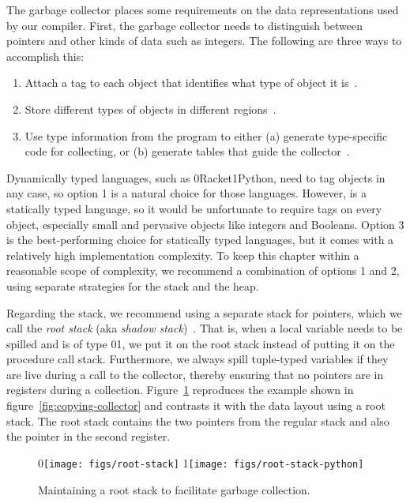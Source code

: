 \documentclass[7x10]{TimesAPriori_MIT}%
\def\racketEd{0}
\def\pythonEd{1}
\def\edition{1}
\newcommand{\racket}[1]{{\if\edition\racketEd{#1}\fi}}
\newcommand{\pythonColor}[0]{}
\newcommand{\python}[1]{{\if\edition\pythonEd\pythonColor #1\fi}}
\numberwithin{theorem}{chapter}
\numberwithin{definition}{chapter}
\numberwithin{equation}{chapter}
\begin{document}
The garbage collector places some requirements on the data
representations used by our compiler. First, the garbage collector
needs to distinguish between pointers and other kinds of data such as
integers. The following are three ways to accomplish this:
\begin{enumerate}
\item Attach a tag to each object that identifies what type of
  object it is~\citep{McCarthy:1960dz}.
\item Store different types of objects in different
  regions~\citep{Steele:1977ab}.
\item Use type information from the program to either (a) generate
  type-specific code for collecting, or (b) generate tables that 
  guide the collector~\citep{Appel:1989aa,Goldberg:1991aa,Diwan:1992aa}.
\end{enumerate}
Dynamically typed languages, such as \racket{Racket}\python{Python},
need to tag objects in any case, so option 1 is a natural choice for those
languages.  However, \LangVec{} is a statically typed language, so it
would be unfortunate to require tags on every object, especially small
and pervasive objects like integers and Booleans.  Option 3 is the
best-performing choice for statically typed languages, but it comes with
a relatively high implementation complexity. To keep this chapter
within a reasonable scope of complexity, we recommend a combination of options
1 and 2, using separate strategies for the stack and the heap.

Regarding the stack, we recommend using a separate stack for pointers,
which we call the \emph{root stack}
(aka \emph{shadow stack})~\citep{Siebert:2001aa,Henderson:2002aa,Baker:2009aa}.
That is, when a local variable needs to be spilled and is of type
\racket{}\python{}, we put it on the
root stack instead of putting it on the procedure call
stack. Furthermore, we always spill tuple-typed variables if they are
live during a call to the collector, thereby ensuring that no pointers
are in registers during a collection. Figure~\ref{fig:shadow-stack}
reproduces the example shown in figure~\ref{fig:copying-collector} and
contrasts it with the data layout using a root stack. The root stack
contains the two pointers from the regular stack and also the pointer
in the second register.

\begin{figure}[tbp]
  \centering
  \begin{tcolorbox}[colback=white]
    \racket{\texttt{[image: figs/root-stack]}}
  \python{\texttt{[image: figs/root-stack-python]}}
  \end{tcolorbox}

  \caption{Maintaining a root stack to facilitate garbage collection.}
\label{fig:shadow-stack}
\end{figure}
\end{document}

